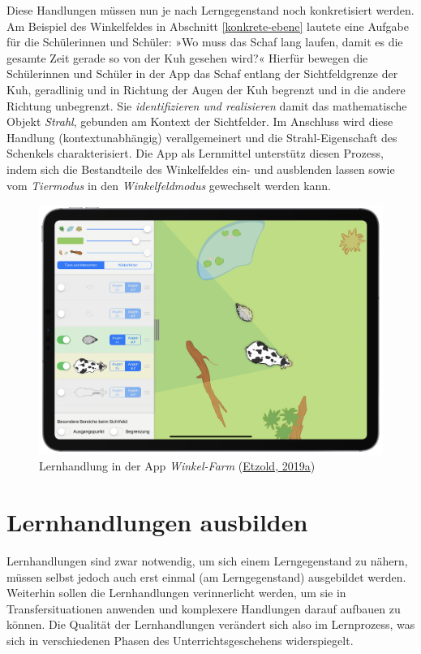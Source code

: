 \documentclass[
]{scrbook}
\theoremstyle{definition}
\theoremstyle{definition}
\theoremstyle{definition}
\theoremstyle{definition}
\theoremstyle{remark}
\begin{document}
Diese Handlungen müssen nun je nach Lerngegenstand noch konkretisiert werden. Am Beispiel des Winkelfeldes in Abschnitt \ref{konkrete-ebene} lautete eine Aufgabe für die Schülerinnen und Schüler: »Wo muss das Schaf lang laufen, damit es die gesamte Zeit gerade so von der Kuh gesehen wird?« Hierfür bewegen die Schülerinnen und Schüler in der App das Schaf entlang der Sichtfeldgrenze der Kuh, geradlinig und in Richtung der Augen der Kuh begrenzt und in die andere Richtung unbegrenzt. Sie \emph{identifizieren und realisieren} damit das mathematische Objekt \emph{Strahl}, gebunden am Kontext der Sichtfelder. Im Anschluss wird diese Handlung (kontextunabhängig) verallgemeinert und die Strahl-Eigenschaft des Schenkels charakterisiert. Die App als Lernmittel unterstütz diesen Prozess, indem sich die Bestandteile des Winkelfeldes ein- und ausblenden lassen sowie vom \emph{Tiermodus} in den \emph{Winkelfeldmodus} gewechselt werden kann.



\begin{figure}

{\centering \includegraphics[width=0.5\linewidth]{pictures/1-Winkelfarm} 

}

\caption{Lernhandlung in der App \emph{Winkel-Farm} (\protect\hyperlink{ref-Etzold:2019}{Etzold, 2019a})}\label{fig:HandlungSchaf}
\end{figure}

\hypertarget{lernhandlungen-ausbilden}{%
\section{Lernhandlungen ausbilden}\label{lernhandlungen-ausbilden}}

Lernhandlungen sind zwar notwendig, um sich einem Lerngegenstand zu nähern, müssen selbst jedoch auch erst einmal (am Lerngegenstand) ausgebildet werden. Weiterhin sollen die Lernhandlungen verinnerlicht werden, um sie in Transfersituationen anwenden und komplexere Handlungen darauf aufbauen zu können. Die Qualität der Lernhandlungen verändert sich also im Lernprozess, was sich in verschiedenen Phasen des Unterrichtsgeschehens widerspiegelt.
\end{document}
